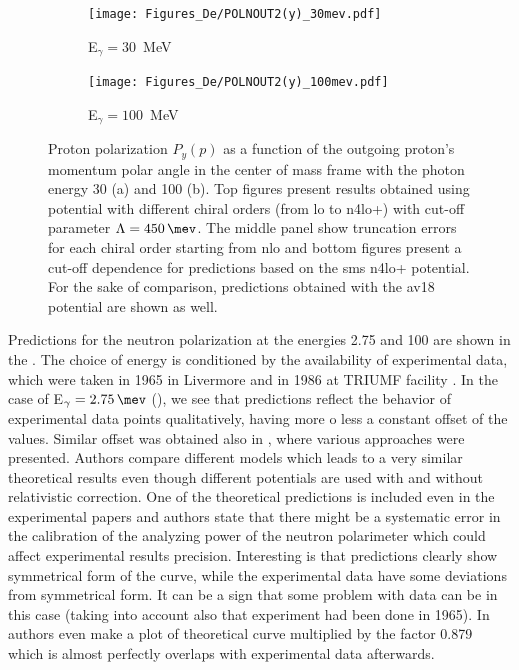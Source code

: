     \begin{figure}[h]
        \centering
        \begin{subfigure}[b]{0.46\textwidth}
            \caption{\small E$_\gamma = 30$~MeV}
            \texttt{[image: Figures\_De/POLNOUT2(y)\_30mev.pdf]}
            \label{PY_30_vert}
        \end{subfigure}
        \begin{subfigure}[b]{0.46\textwidth}
            \caption{\small E$_\gamma = 100$~MeV}
            \texttt{[image: Figures\_De/POLNOUT2(y)\_100mev.pdf]}
            \label{PY_100_vert}
        \end{subfigure}
        \caption{Proton polarization $P_y(p)$ 
        \label{PY_30_100_vert}
        as a function of the outgoing proton's momentum polar angle in the center of mass frame 
        with the photon energy \SI{30}{\mev} (a) and \SI{100}{\mev} (b).
        Top figures present results obtained using potential
        with different chiral orders (from \gls{lo} to \gls{n4lo+}) with cut-off parameter $\Lambda=\SI{450}{\mev}$.
        The middle panel show truncation errors for each 
        chiral order starting from \gls{nlo} and
        bottom figures present a cut-off dependence for predictions
        based on the \gls{sms} \gls{n4lo+} potential.
        For the sake of comparison, predictions obtained with the \gls*{av18} potential 
        are shown as well.}
    \end{figure}


    Predictions for the neutron polarization at the energies \SI{2.75}{\mev} and \SI{100}{\mev} are shown in the
    . The choice of energy is conditioned by the availability of experimental data,
    which were taken in 1965 in Livermore \cite{Jewell_neuteronpolarization} and 
    in 1986 at TRIUMF facility \cite{CAMERON_neuteronpolarization}.
    In the case of E$_\gamma = \SI{2.75}{\mev}$ (), we see that predictions reflect
    the behavior of experimental data points qualitatively,
    having more o less a constant offset of the values. Similar offset was obtained
    also in \cite{ArenhovelPhotodisint1991}, where various approaches  were presented.
    Authors compare different models which leads to a very similar theoretical results
    even though different potentials are used with and without relativistic correction.
    One of the theoretical predictions is included even in the experimental papers
    \cite{Jewell_neuteronpolarization} and authors state that there might be a
    systematic error in the calibration of the analyzing power
    of the neutron polarimeter which could affect experimental results precision.
    Interesting is that predictions clearly show symmetrical form of the curve, while the experimental data
    have some deviations from symmetrical form. It can be a sign that some problem with data can be
    in this case (taking into account also that experiment had been done in 1965).
    In \cite{Jewell_neuteronpolarization} authors even make a plot of theoretical curve
    multiplied by the factor 0.879 which is almost perfectly overlaps with experimental data afterwards. 

